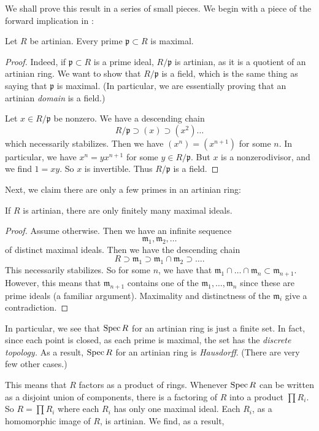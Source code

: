 We shall prove this result in a series of small pieces. We begin with a piece
of the forward implication in :
\begin{lemma} Let $R$ be artinian. 
Every prime $\mathfrak{p} \subset R$ is maximal.
\end{lemma} 
\begin{proof} 
Indeed, if $\mathfrak{p} \subset R$ is a prime ideal, $R/\mathfrak{p}$ is
artinian, as it is a quotient of an artinian ring. We want to show that
$R/\mathfrak{p}$ is a field,
which is the same thing as saying that $\mathfrak{p}$ is maximal.
(In particular, we are essentially proving that an artinian \emph{domain} is a
field.)

Let $x \in
R/\mathfrak{p}$ be nonzero. We have a descending chain
\[ R/\mathfrak{p} \supset (x) \supset (x^{2}) \dots  \]
which necessarily stabilizes. Then we have $(x^n) = (x^{n+1})$ for some $n$. In
particular, we have $x^n = y x^{n+1}$ for some $y \in R/\mathfrak{p}$. But $x$
is a nonzerodivisor, and  we find $ 1 = xy$. So $x$ is invertible. Thus
$R/\mathfrak{p}$ is a field.
\end{proof} 

Next, we claim there are only a few primes in an artinian ring:
\begin{lemma} 
If $R$ is artinian, there are only finitely many maximal ideals.
\end{lemma} 
\begin{proof} 
Assume otherwise. Then we have an infinite sequence
\[ \mathfrak{m}_1,  \mathfrak{m}_2, \dots  \]
of distinct maximal ideals. Then we have the descending chain
\[ R \supset \mathfrak{m}_1 \supset \mathfrak{m}_1 \cap \mathfrak{m}_2 \supset \dots.  \]
This necessarily stabilizes. So for some $n$, we have that $\mathfrak{m}_1 \cap \dots \cap 
\mathfrak{m}_n \subset \mathfrak{m}_{n+1}$. However, this means that
$\mathfrak{m}_{n+1}$ contains one of the $\mathfrak{m}_1, \dots,
\mathfrak{m}_n$ since these are prime ideals (a familiar argument).  Maximality
and distinctness of the $\mathfrak{m}_i$ give a contradiction.
\end{proof} 

In particular, we see that $\operatorname{Spec} R$ for an artinian ring is just a finite set.
In fact, since each point is closed, as each prime is maximal, the set has the
\emph{discrete topology.} As a result, $\operatorname{Spec} R$ for an artinian ring is
\emph{Hausdorff}. (There are very few other cases.)

This means that $R$ factors as a product of rings. Whenever $\operatorname{Spec} R$ can be
written as a disjoint union of components, there is a factoring of $R$ into a
product $\prod R_i$. So $R = \prod R_i$ where each $R_i$ has
only one maximal ideal. Each $R_i$, as a homomorphic image of $R$, is artinian. We find, as a result, 

